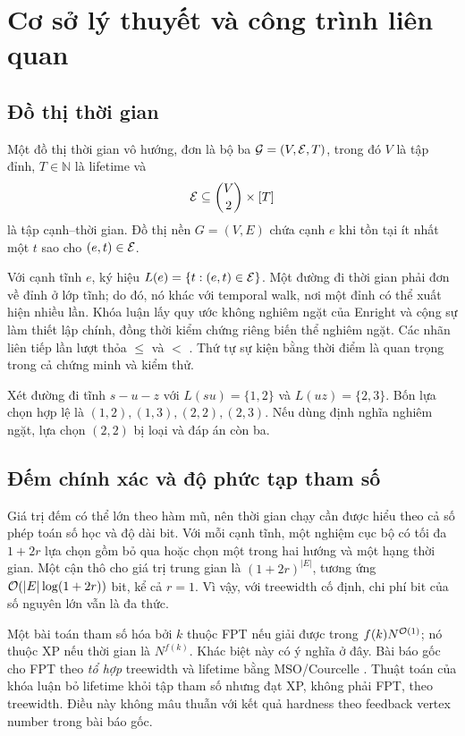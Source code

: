 \chapter{Cơ sở lý thuyết và công trình liên quan}
\label{chap:background}

\section{Đồ thị thời gian}

\begin{definition}
Một đồ thị thời gian vô hướng, đơn là bộ ba $\mathcal{G}=(V,\mathcal{E},T)$, trong đó $V$ là tập đỉnh, $T\in\mathbb{N}$ là lifetime và
\[
  \mathcal{E}\subseteq \binom{V}{2}\times[T]
\]
là tập cạnh--thời gian. Đồ thị nền $G=(V,E)$ chứa cạnh $e$ khi tồn tại ít nhất một $t$ sao cho $(e,t)\in\mathcal{E}$.
\end{definition}

Với cạnh tĩnh $e$, ký hiệu $L(e)=\{t:(e,t)\in\mathcal{E}\}$. Một đường đi thời gian phải đơn về đỉnh ở lớp tĩnh; do đó, nó khác với temporal walk, nơi một đỉnh có thể xuất hiện nhiều lần. Khóa luận lấy quy ước không nghiêm ngặt của Enright và cộng sự làm thiết lập chính, đồng thời kiểm chứng riêng biến thể nghiêm ngặt. Các nhãn liên tiếp lần lượt thỏa $\le$ và $<$ \cite{enright2025}. Thứ tự sự kiện bằng thời điểm là quan trọng trong cả chứng minh và kiểm thử.

\begin{example}
Xét đường đi tĩnh $s-u-z$ với $L(su)=\{1,2\}$ và $L(uz)=\{2,3\}$. Bốn lựa chọn hợp lệ là $(1,2),(1,3),(2,2),(2,3)$. Nếu dùng định nghĩa nghiêm ngặt, lựa chọn $(2,2)$ bị loại và đáp án còn ba.
\end{example}

\section{Đếm chính xác và độ phức tạp tham số}

Giá trị đếm có thể lớn theo hàm mũ, nên thời gian chạy cần được hiểu theo cả số phép toán số học và độ dài bit. Với mỗi cạnh tĩnh, một nghiệm cục bộ có tối đa $1+2r$ lựa chọn gồm bỏ qua hoặc chọn một trong hai hướng và một hạng thời gian. Một cận thô cho giá trị trung gian là $(1+2r)^{|E|}$, tương ứng $\mathcal{O}(|E|\log(1+2r))$ bit, kể cả $r=1$. Vì vậy, với treewidth cố định, chi phí bit của số nguyên lớn vẫn là đa thức.

Một bài toán tham số hóa bởi $k$ thuộc FPT nếu giải được trong $f(k)N^{\mathcal{O}(1)}$; nó thuộc XP nếu thời gian là $N^{f(k)}$. Khác biệt này có ý nghĩa ở đây. Bài báo gốc cho FPT theo \emph{tổ hợp} treewidth và lifetime bằng MSO/Courcelle \cite{enright2025,courcelle2012}. Thuật toán của khóa luận bỏ lifetime khỏi tập tham số nhưng đạt XP, không phải FPT, theo treewidth. Điều này không mâu thuẫn với kết quả hardness theo feedback vertex number trong bài báo gốc.

